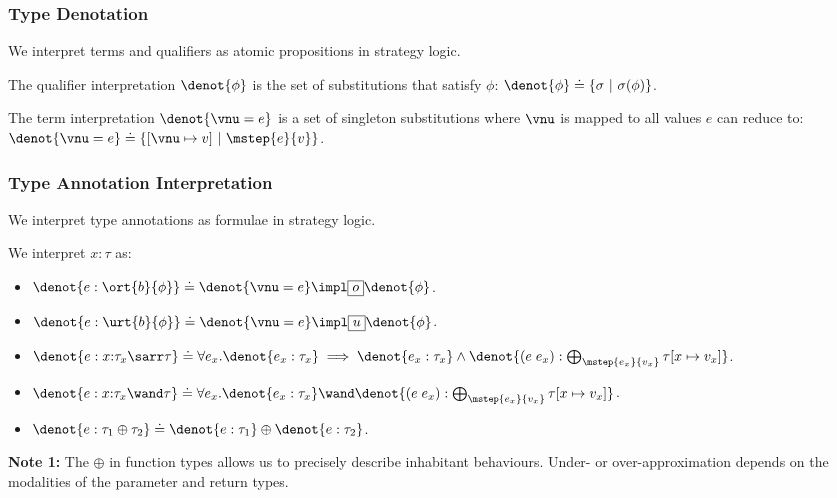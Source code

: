 \begin{frame}[fragile]
    \frametitle{Type Denotation}

We interpret terms and qualifiers as atomic propositions in strategy logic.

\begin{definition} The qualifier interpretation $\denot{\phi}$ is the set of substitutions that satisfy $\phi$: $\denot{\phi} \doteq \{\sigma ~|~ \sigma(\phi) \}$.
\end{definition}

\begin{definition} The term interpretation $\denot{\vnu = e}$ is a set of singleton substitutions where $\vnu$ is mapped to all values $e$ can reduce to: $\denot{\vnu = e} \doteq \{[\vnu \mapsto v] ~|~ \mstep{e}{v} \}$.
\end{definition}

\end{frame}

\begin{frame}[fragile]
    \frametitle{Type Annotation Interpretation}

We interpret type annotations as formulae in strategy logic.

\begin{definition} We interpret $x:\tau$ as:
\begin{itemize}
    \item $\denot{e : \ort{b}{\phi}} \doteq \denot{\vnu = e}\impl \subExt \denot{\phi} $.
    \item $\denot{e : \urt{b}{\phi}} \doteq \denot{\vnu = e}\impl \supExt \denot{\phi} $.
    \item $\denot{e : x{:}\tau_x \sarr \tau} \doteq \forall e_x. \denot{e_x : \tau_x} \implies \denot{e_x : \tau_x} \land \denot{(e\;e_x) : \bigoplus_{\mstep{e_x}{v_x} } \tau[x\mapsto v_x]} $.
    \item $\denot{e : x{:}\tau_x \wand \tau} \doteq \forall e_x. \denot{e_x : \tau_x} \wand \denot{(e\;e_x) : \bigoplus_{\mstep{e_x}{v_x} } \tau[x\mapsto v_x]} $.
    \item $\denot{e : \tau_1 \oplus \tau_2} \doteq \denot{e : \tau_1} \oplus \denot{e : \tau_2} $.
\end{itemize}
\end{definition}

\textbf{Note 1:} The $\oplus$ in function types allows us to precisely describe inhabitant behaviours. Under- or over-approximation depends on the modalities of the parameter and return types.

\end{frame}

